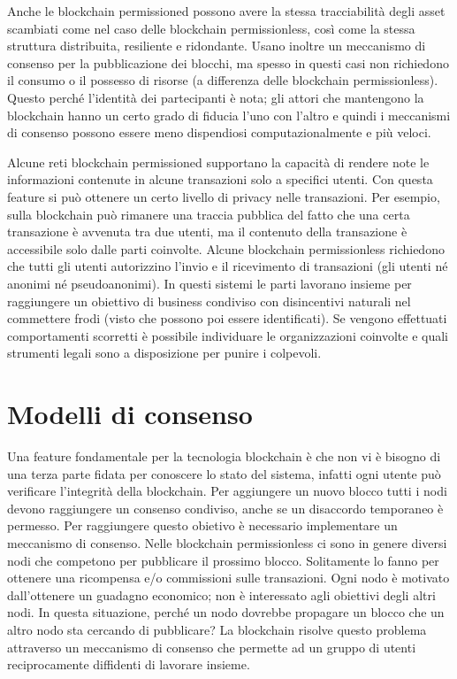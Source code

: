 Anche le blockchain permissioned possono avere la stessa tracciabilità degli asset
scambiati come nel caso delle blockchain permissionless,
così come la stessa struttura distribuita, resiliente e ridondante.
Usano inoltre un meccanismo di consenso per la pubblicazione dei blocchi, ma spesso in questi casi
non richiedono il consumo o il possesso di risorse (a differenza delle blockchain permissionless).
Questo perché l'identità dei partecipanti è nota; gli attori che mantengono la blockchain hanno
un certo grado di fiducia l'uno con l'altro e quindi i meccanismi di consenso possono essere
meno dispendiosi computazionalmente e più veloci.

Alcune reti blockchain permissioned supportano la capacità di rendere note
le informazioni contenute in alcune transazioni solo a specifici utenti.
Con questa feature si può ottenere un certo livello di privacy nelle transazioni. Per esempio,
sulla blockchain può rimanere una traccia pubblica del fatto che una certa transazione è avvenuta tra
due utenti, ma il contenuto della transazione è accessibile solo dalle parti coinvolte.
Alcune blockchain permissionless richiedono che tutti gli utenti autorizzino l'invio e il
ricevimento di transazioni (gli utenti né anonimi né pseudoanonimi).
In questi sistemi le parti lavorano insieme per raggiungere un obiettivo
di business condiviso con disincentivi naturali nel commettere frodi (visto che possono poi essere identificati).
Se vengono effettuati comportamenti scorretti è possibile individuare le organizzazioni coinvolte e quali
strumenti legali sono a disposizione per punire i colpevoli.


\section{Modelli di consenso}
\label{intro:modelli-consenso}
Una feature fondamentale per la tecnologia blockchain è che non vi è bisogno di una terza parte fidata
per conoscere lo stato del sistema, infatti ogni utente può verificare l'integrità della blockchain.
Per aggiungere un nuovo blocco tutti i nodi devono raggiungere un consenso condiviso, anche se un
disaccordo temporaneo è permesso. Per raggiungere questo obietivo è necessario implementare un meccanismo
di consenso. Nelle blockchain permissionless ci sono in genere diversi nodi che competono per pubblicare
il prossimo blocco. Solitamente lo fanno per ottenere una ricompensa e/o commissioni sulle transazioni.
Ogni nodo è motivato dall'ottenere un guadagno economico; non è interessato agli obiettivi degli altri
nodi. In questa situazione, perché un nodo dovrebbe propagare un blocco che un altro
nodo sta cercando di pubblicare? La blockchain risolve questo problema attraverso un meccanismo di
consenso che permette ad un gruppo di utenti reciprocamente diffidenti di lavorare insieme.




